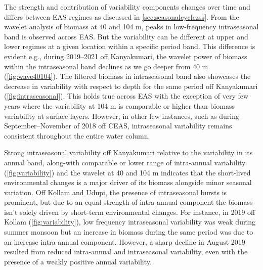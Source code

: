\documentclass[authoryear,review,12pt]{elsarticle}
\begin{document}
	The strength and contribution of variability components changes over time  and differs between EAS regimes as discussed in \cref{sec:seasonalcyclezss}. From the wavelet analysis of biomass at 40 and 104 m, peaks in low-frequency intraseasonal band is observed across EAS. But the variability can be different at upper and lower regimes at a given location within a specific period band. This difference is evident e.g., during 2019--2021 off Kanyakumari, the wavelet power of biomass within the intraseasonal band declines as we go deeper from 40 m (\cref{fig:wave40104}). The filtered biomass in intraseasonal band also showcases the decrease in variability with respect to depth for the same period off Kanyakumari (\cref{fig:intraseasonal}). This holds true across EAS with the exception of very few years where the variability at 104 m is comparable or higher than biomass variability at surface layers. However, in other few instances, such as during September--November of 2018 off CEAS, intraseasonal variability remains consistent throughout the entire water column. 
	
	Strong intraseasonal variability off Kanyakumari relative to the variability in its annual band, along-with comparable or lower range of intra-annual variability (\cref{fig:variability}) and the wavelet at 40 and 104 m indicates that the short-lived environmental changes is a major driver of its biomass alongside minor seasonal variation. Off Kollam and Udupi, the presence of intraseasonal bursts is prominent, but due to an equal strength of intra-annual component the biomass isn't solely driven by short-term environmental changes. For instance, in 2019 off Kollam (\cref{fig:variability}), low frequency intraseasonal variability was weak during summer monsoon but an increase in biomass during the same period was due to an increase intra-annual component. However, a sharp decline in August 2019 resulted from reduced intra-annual and intraseasonal variability, even with the presence of a weakly positive annual variability. 
	
\end{document}
